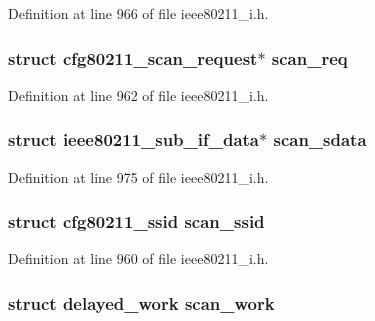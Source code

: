 Definition at line 966 of file ieee80211\-\_\-i.\-h.

\hypertarget{structieee80211__local_aaa4fd1e0ca28860a5750a01837c6c325}{
\subsubsection[{scan\-\_\-req}]{\setlength{\rightskip}{0pt plus 5cm}struct cfg80211\-\_\-scan\-\_\-request$\ast$ scan\-\_\-req}}\label{structieee80211__local_aaa4fd1e0ca28860a5750a01837c6c325}


Definition at line 962 of file ieee80211\-\_\-i.\-h.

\hypertarget{structieee80211__local_aa5cd69a012fd9276c05cfbfccd1e0a51}{
\subsubsection[{scan\-\_\-sdata}]{\setlength{\rightskip}{0pt plus 5cm}struct {\bf ieee80211\-\_\-sub\-\_\-if\-\_\-data}$\ast$ scan\-\_\-sdata}}\label{structieee80211__local_aa5cd69a012fd9276c05cfbfccd1e0a51}


Definition at line 975 of file ieee80211\-\_\-i.\-h.

\hypertarget{structieee80211__local_aa25532a782ada88d435b24dfda931173}{
\subsubsection[{scan\-\_\-ssid}]{\setlength{\rightskip}{0pt plus 5cm}struct cfg80211\-\_\-ssid scan\-\_\-ssid}}\label{structieee80211__local_aa25532a782ada88d435b24dfda931173}


Definition at line 960 of file ieee80211\-\_\-i.\-h.

\hypertarget{structieee80211__local_a63c27bb90b892d939725e333b3b64514}{
\subsubsection[{scan\-\_\-work}]{\setlength{\rightskip}{0pt plus 5cm}struct delayed\-\_\-work scan\-\_\-work}}\label{structieee80211__local_a63c27bb90b892d939725e333b3b64514}


